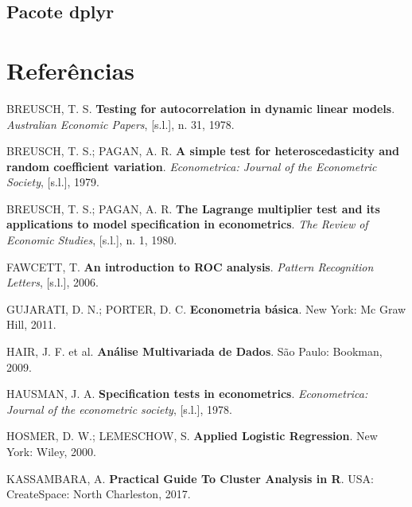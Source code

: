 \documentclass[12pt,brazil,oneside]{book}
\begin{document}
\hypertarget{pacote-dplyr}{%
\section{Pacote dplyr}\label{pacote-dplyr}}

\setlength{\parindent}{0.0cm}

\RaggedRight

\frenchspacing

\hypertarget{referencias}{%
\chapter*{Referências}\label{referencias}}

\hypertarget{refs}{}
\leavevmode\hypertarget{ref-breusch1978}{}%
BREUSCH, T. S. \textbf{Testing for autocorrelation in dynamic linear models}. \emph{Australian Economic Papers}, {[}s.l.{]}, n. 31, 1978.

\leavevmode\hypertarget{ref-breusch1979}{}%
BREUSCH, T. S.; PAGAN, A. R. \textbf{A simple test for heteroscedasticity and random coefficient variation}. \emph{Econometrica: Journal of the Econometric Society}, {[}s.l.{]}, 1979.

\leavevmode\hypertarget{ref-breusch1980}{}%
BREUSCH, T. S.; PAGAN, A. R. \textbf{The Lagrange multiplier test and its applications to model specification in econometrics}. \emph{The Review of Economic Studies}, {[}s.l.{]}, n. 1, 1980.

\leavevmode\hypertarget{ref-Fawcett2006}{}%
FAWCETT, T. \textbf{An introduction to ROC analysis}. \emph{Pattern Recognition Letters}, {[}s.l.{]}, 2006.

\leavevmode\hypertarget{ref-Gujarati2011}{}%
GUJARATI, D. N.; PORTER, D. C. \textbf{Econometria básica}. New York: Mc Graw Hill, 2011.

\leavevmode\hypertarget{ref-Hair2009}{}%
HAIR, J. F. et al. \textbf{Análise Multivariada de Dados}. São Paulo: Bookman, 2009.

\leavevmode\hypertarget{ref-hausman1978}{}%
HAUSMAN, J. A. \textbf{Specification tests in econometrics}. \emph{Econometrica: Journal of the econometric society}, {[}s.l.{]}, 1978.

\leavevmode\hypertarget{ref-Hosmer2000}{}%
HOSMER, D. W.; LEMESCHOW, S. \textbf{Applied Logistic Regression}. New York: Wiley, 2000.

\leavevmode\hypertarget{ref-Kassambara2017}{}%
KASSAMBARA, A. \textbf{Practical Guide To Cluster Analysis in R}. USA: CreateSpace: North Charleston, 2017.
\end{document}

